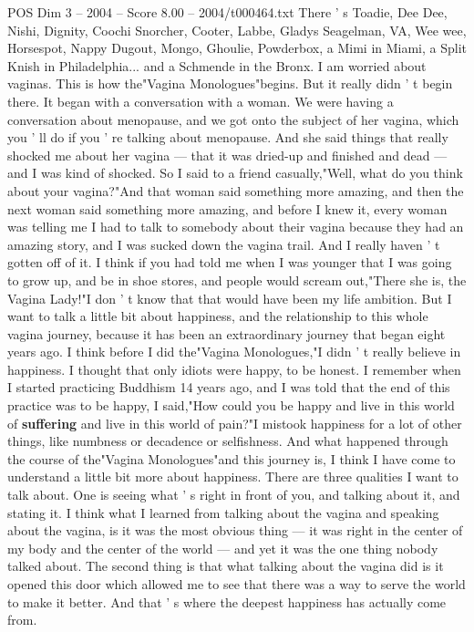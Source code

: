 \begin{textsample}{POS Dim 3 – 2004 – Score 8.00 – 2004/t000464.txt}
There ' s Toadie, Dee Dee, Nishi, Dignity, Coochi Snorcher, Cooter, Labbe, Gladys Seagelman, VA, Wee wee, Horsespot, Nappy Dugout, Mongo, Ghoulie, Powderbox, a Mimi in Miami, a Split Knish in Philadelphia... and a Schmende in the Bronx.
I am worried about vaginas.
This is how the"Vagina Monologues"begins.
But it really didn ' t begin there.
It began with a conversation with a woman.
We were having a conversation about menopause, and we got onto the subject of her vagina, which you ' ll do if you ' re talking about menopause.
And she said things that really shocked me about her vagina — that it was dried-up and finished and dead — and I was kind of shocked.
So I said to a friend casually,"Well, what do you think about your vagina?"And that woman said something more amazing, and then the next woman said something more amazing, and before I knew it, every woman was telling me I had to talk to somebody about their vagina because they had an amazing story, and I was sucked down the vagina trail.
And I really haven ' t gotten off of it.
I think if you had told me when I was younger that I was going to grow up, and be in shoe stores, and people would scream out,"There she is, the Vagina Lady!"I don ' t know that that would have been my life ambition.
But I want to talk a little bit about happiness, and the relationship to this whole vagina journey, because it has been an extraordinary journey that began eight years ago.
I think before I did the"Vagina Monologues,"I didn ' t really believe in happiness.
I thought that only idiots were happy, to be honest.
I remember when I started practicing Buddhism 14 years ago, and I was told that the end of this practice was to be happy, I said,"How could you be happy and live in this world of \textbf{suffering} and live in this world of pain?"I mistook happiness for a lot of other things, like numbness or decadence or selfishness.
And what happened through the course of the"Vagina Monologues"and this journey is, I think I have come to understand a little bit more about happiness.
There are three qualities I want to talk about.
One is seeing what ' s right in front of you, and talking about it, and stating it.
I think what I learned from talking about the vagina and speaking about the vagina, is it was the most obvious thing — it was right in the center of my body and the center of the world — and yet it was the one thing nobody talked about.
The second thing is that what talking about the vagina did is it opened this door which allowed me to see that there was a way to serve the world to make it better.
And that ' s where the deepest happiness has actually come from.

\end{textsample}
